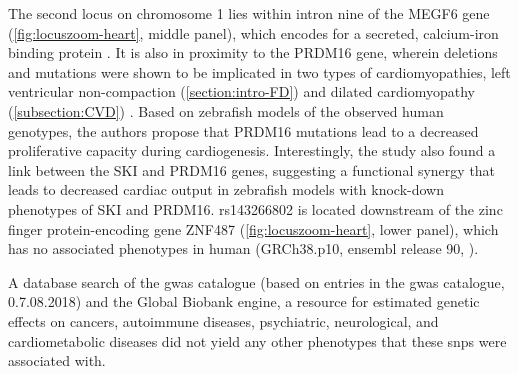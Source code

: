 The second locus on chromosome \num{1} lies within intron nine of the MEGF6 gene (\cref{fig:locuszoom-heart}, middle panel), which encodes for a secreted, calcium-iron binding protein \citep{Nakayama1998}. It is also in proximity to the PRDM16 gene, wherein deletions and mutations were shown to be implicated in two types of cardiomyopathies, left ventricular non-compaction (\cref{section:intro-FD}) and dilated cardiomyopathy  (\cref{subsection:CVD}) \citep{Arndt2013}. Based on zebrafish models of the observed human genotypes, the authors propose that PRDM16 mutations lead to a decreased proliferative capacity during cardiogenesis. Interestingly, the study also found a link between the SKI and PRDM16 genes, suggesting a functional synergy that leads to decreased cardiac output in zebrafish models with knock-down phenotypes of SKI and PRDM16. rs143266802 is located downstream of the zinc finger protein-encoding gene ZNF487 (\cref{fig:locuszoom-heart}, lower panel), which has no associated phenotypes in human (GRCh38.p10, ensembl release 90, \citep{Aken2016}).  

A database search of the \gls{gwas} catalogue \citep{MacArthur2017} (based on entries in the \gls{gwas} catalogue, 0.7.08.2018) and the Global Biobank engine, a resource for estimated genetic effects on cancers, autoimmune diseases, psychiatric, neurological, and cardiometabolic diseases \citep{GBE2017} did not yield any other phenotypes that these \glspl{snp} were associated with.


